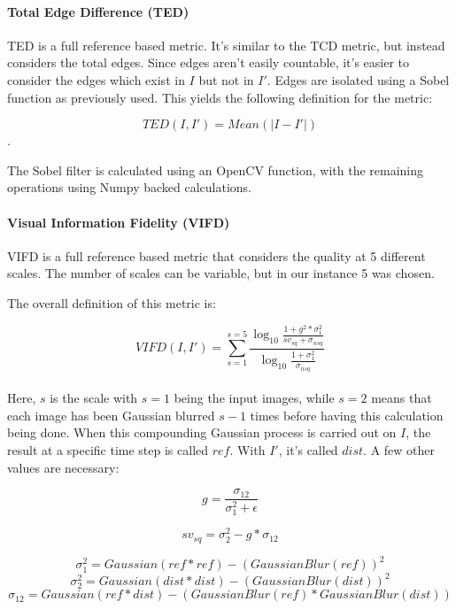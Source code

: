 \documentclass[10pt,a4paper]{article}
\begin{document}
            \paragraph{Total Edge Difference (TED)}
                TED is a full reference based metric. It's similar to the TCD metric, but instead considers the total edges.
                Since edges aren't easily countable, it's easier to consider the edges which exist in $I$ but not in $I'$. 
                Edges are isolated using a Sobel function as previously used. This yields the following definition for the metric:

                $$TED(I, I') = Mean(|I - I'|)$$.

                The Sobel filter is calculated using an OpenCV function, with the remaining operations using Numpy backed calculations.

            \paragraph{Visual Information Fidelity (VIFD)}
                VIFD is a full reference based metric that considers the quality at 5 different scales. The number of scales can be variable, but in our instance 5 was chosen.

                The overall definition of this metric is:

                $$VIFD(I, I') = \sum_{s = 1}^{s=5} \frac{
                        \log_{10} 
                        \frac{1 + g^2 * \sigma_{1}^2}
                        {sv_{sq} + \sigma_{nsq}}
                    }{
                        \log_{10}
                        \frac{1 + \sigma_{1}^2}
                        {\sigma_{nsq}}
                    }$$\\

                Here, $s$ is the scale with $s=1$ being the input images, while $s=2$ means that each image has been Gaussian blurred $s-1$ times before having this calculation being done.
                When this compounding Gaussian process is carried out on $I$, the result at a specific time step is called $ref$. With $I'$, it's called $dist$.
                A few other values are necessary:


                $$g = \frac{\sigma_{12}}{\sigma_{1}^2 + \epsilon}$$
                
                $$sv_{sq} = \sigma_{2}^2 - g*\sigma_{12}$$

                $$\sigma_{1}^2 = Gaussian(ref * ref) - (GaussianBlur(ref))^2$$
                $$\sigma_{2}^2 = Gaussian(dist * dist) - (GaussianBlur(dist))^2$$
                $$\sigma_{12} = Gaussian(ref * dist) - (GaussianBlur(ref) * GaussianBlur(dist))$$\\
\end{document}
